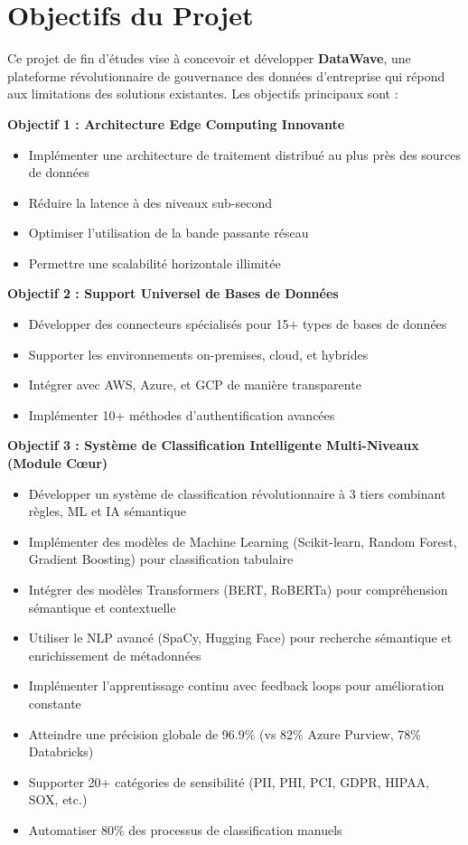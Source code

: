 \section*{Objectifs du Projet}

Ce projet de fin d'études vise à concevoir et développer \textbf{DataWave}, une plateforme révolutionnaire de gouvernance des données d'entreprise qui répond aux limitations des solutions existantes. Les objectifs principaux sont :

\textbf{Objectif 1 : Architecture Edge Computing Innovante}
\begin{itemize}
    \item Implémenter une architecture de traitement distribué au plus près des sources de données
    \item Réduire la latence à des niveaux sub-second
    \item Optimiser l'utilisation de la bande passante réseau
    \item Permettre une scalabilité horizontale illimitée
\end{itemize}

\textbf{Objectif 2 : Support Universel de Bases de Données}
\begin{itemize}
    \item Développer des connecteurs spécialisés pour 15+ types de bases de données
    \item Supporter les environnements on-premises, cloud, et hybrides
    \item Intégrer avec AWS, Azure, et GCP de manière transparente
    \item Implémenter 10+ méthodes d'authentification avancées
\end{itemize}

\textbf{Objectif 3 : Système de Classification Intelligente Multi-Niveaux (Module Cœur)}
\begin{itemize}
    \item Développer un système de classification révolutionnaire à 3 tiers combinant règles, ML et IA sémantique
    \item Implémenter des modèles de Machine Learning (Scikit-learn, Random Forest, Gradient Boosting) pour classification tabulaire
    \item Intégrer des modèles Transformers (BERT, RoBERTa) pour compréhension sémantique et contextuelle
    \item Utiliser le NLP avancé (SpaCy, Hugging Face) pour recherche sémantique et enrichissement de métadonnées
    \item Implémenter l'apprentissage continu avec feedback loops pour amélioration constante
    \item Atteindre une précision globale de 96.9\% (vs 82\% Azure Purview, 78\% Databricks)
    \item Supporter 20+ catégories de sensibilité (PII, PHI, PCI, GDPR, HIPAA, SOX, etc.)
    \item Automatiser 80\% des processus de classification manuels
\end{itemize}

